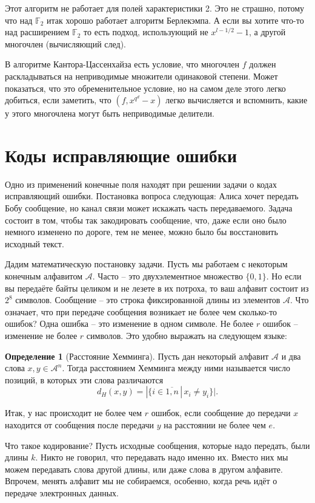 \documentclass[12pt,a4paper,oneside]{book}
\theoremstyle{definition}
\newtheorem*{defn}{\color{yellow!30!red} Определение}
\newcommand{\mc}[1]{\mathcal{#1}}
\newcommand{\ovl}{\overline}
\newcommand{\F}{\mathbb F}
\def\dfn{\begin{defn}}
\def\edfn{\end{defn}}
\begin{document}
Этот алгоритм не работает для полей характеристики 2. Это не страшно, потому что над $\F_2$ итак хорошо работает алгоритм Берлекэмпа. А если вы хотите что-то над расширением $\F_2$ то есть подход, использующий не $x^{l-1/2}-1$, а другой многочлен (вычисляющий след). 

В алгоритме Кантора-Цассенхайза есть условие, что многочлен $f$ должен раскладываться на неприводимые множители одинаковой степени. Может показаться, что это обременительное условие, но на самом деле этого легко добиться, если заметить, что $(f,x^{q^d}-x)$ легко вычисляется и вспомнить, какие у этого многочлена могут быть неприводимые делители.


\section{Коды исправляющие ошибки}

Одно из применений конечные поля находят при решении задачи о кодах исправляющий ошибки. Постановка вопроса следующая: Алиса хочет передать Бобу сообщение, но канал связи может искажать часть передаваемого. Задача состоит в том, чтобы так закодировать сообщение, что, даже если оно было немного изменено по дороге, тем не менее, можно было бы восстановить исходный текст.

Дадим математическую постановку задачи. Пусть мы работаем с некоторым конечным алфавитом $\mc A$. Часто -- это двухэлементное множество $\{0,1\}$. Но если вы передаёте байты целиком и не лезете в их потроха, то ваш алфавит состоит из  $2^8$ символов.  Сообщение -- это строка фиксированной длины из элементов $\mc A$. Что означает, что при передаче сообщения возникает не более чем  сколько-то ошибок? Одна ошибка -- это изменение в одном символе. Не более $r$ ошибок -- изменение не более $r$ символов. Это удобно выражать на следующем языке:

\dfn[Расстояние Хемминга] Пусть дан некоторый алфавит $\mc A$ и два слова $x,y \in \mc A^n$. Тогда расстоянием Хемминга между ними называется число позиций, в которых эти слова различаются
$$d_H(x,y)=|\{i \in \ovl{1, n} \, |\, x_i \neq y_i \}|.$$
\edfn

Итак, у нас происходит не более чем $r$ ошибок, если сообщение до передачи $x$ находится от сообщения после передачи $y$ на расстоянии не более чем $e$.

Что такое кодирование? Пусть исходные сообщения, которые надо передать, были длины $k$. Никто не говорил, что передавать надо именно их. Вместо них мы можем передавать слова другой длины, или даже слова в другом алфавите. Впрочем, менять алфавит мы не собираемся, особенно, когда речь идёт о передаче электронных данных. 
\end{document}
